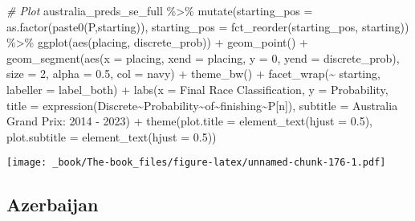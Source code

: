 \documentclass[
]{book}
\newenvironment{Shaded}{\begin{snugshade}}{\end{snugshade}}
\newcommand{\AttributeTok}[1]{\textcolor[rgb]{0.77,0.63,0.00}{#1}}
\newcommand{\CommentTok}[1]{\textcolor[rgb]{0.56,0.35,0.01}{\textit{#1}}}
\newcommand{\DecValTok}[1]{\textcolor[rgb]{0.00,0.00,0.81}{#1}}
\newcommand{\FloatTok}[1]{\textcolor[rgb]{0.00,0.00,0.81}{#1}}
\newcommand{\FunctionTok}[1]{\textcolor[rgb]{0.00,0.00,0.00}{#1}}
\newcommand{\NormalTok}[1]{#1}
\newcommand{\SpecialCharTok}[1]{\textcolor[rgb]{0.00,0.00,0.00}{#1}}
\newcommand{\StringTok}[1]{\textcolor[rgb]{0.31,0.60,0.02}{#1}}
\begin{document}
\begin{Shaded}
\begin{Highlighting}[]
\CommentTok{\# Plot}
\NormalTok{australia\_preds\_se\_full }\SpecialCharTok{\%\textgreater{}\%}
  \FunctionTok{mutate}\NormalTok{(}\AttributeTok{starting\_pos =} \FunctionTok{as.factor}\NormalTok{(}\FunctionTok{paste0}\NormalTok{(}\StringTok{\textquotesingle{}P\textquotesingle{}}\NormalTok{,starting)),}
         \AttributeTok{starting\_pos =} \FunctionTok{fct\_reorder}\NormalTok{(starting\_pos, starting)) }\SpecialCharTok{\%\textgreater{}\%}
  \FunctionTok{ggplot}\NormalTok{(}\FunctionTok{aes}\NormalTok{(placing, discrete\_prob)) }\SpecialCharTok{+}
  \FunctionTok{geom\_point}\NormalTok{() }\SpecialCharTok{+}
  \FunctionTok{geom\_segment}\NormalTok{(}\FunctionTok{aes}\NormalTok{(}\AttributeTok{x =}\NormalTok{ placing, }\AttributeTok{xend =}\NormalTok{ placing, }\AttributeTok{y =} \DecValTok{0}\NormalTok{, }\AttributeTok{yend =}\NormalTok{ discrete\_prob),}
               \AttributeTok{size =} \DecValTok{2}\NormalTok{, }\AttributeTok{alpha =} \FloatTok{0.5}\NormalTok{, }\AttributeTok{col =} \StringTok{\textquotesingle{}navy\textquotesingle{}}\NormalTok{) }\SpecialCharTok{+}
  \FunctionTok{theme\_bw}\NormalTok{() }\SpecialCharTok{+}
  \FunctionTok{facet\_wrap}\NormalTok{(}\SpecialCharTok{\textasciitilde{}}\NormalTok{ starting, }\AttributeTok{labeller =}\NormalTok{ label\_both) }\SpecialCharTok{+}
  \FunctionTok{labs}\NormalTok{(}\AttributeTok{x =} \StringTok{\textquotesingle{}Final Race Classification\textquotesingle{}}\NormalTok{,}
       \AttributeTok{y =} \StringTok{\textquotesingle{}Probability\textquotesingle{}}\NormalTok{,}
       \AttributeTok{title =} \FunctionTok{expression}\NormalTok{(Discrete}\SpecialCharTok{\textasciitilde{}}\NormalTok{Probability}\SpecialCharTok{\textasciitilde{}}\NormalTok{of}\SpecialCharTok{\textasciitilde{}}\NormalTok{finishing}\SpecialCharTok{\textasciitilde{}}\NormalTok{P[n]),}
       \AttributeTok{subtitle =} \StringTok{\textquotesingle{}Australia Grand Prix: 2014 {-} 2023\textquotesingle{}}\NormalTok{) }\SpecialCharTok{+}
  \FunctionTok{theme}\NormalTok{(}\AttributeTok{plot.title =} \FunctionTok{element\_text}\NormalTok{(}\AttributeTok{hjust =} \FloatTok{0.5}\NormalTok{),}
        \AttributeTok{plot.subtitle =} \FunctionTok{element\_text}\NormalTok{(}\AttributeTok{hjust =} \FloatTok{0.5}\NormalTok{)) }
\end{Highlighting}
\end{Shaded}

\texttt{[image: \_book/The-book\_files/figure-latex/unnamed-chunk-176-1.pdf]}

\hypertarget{azerbaijan}{%
\subsection{Azerbaijan}\label{azerbaijan}}
\end{document}
